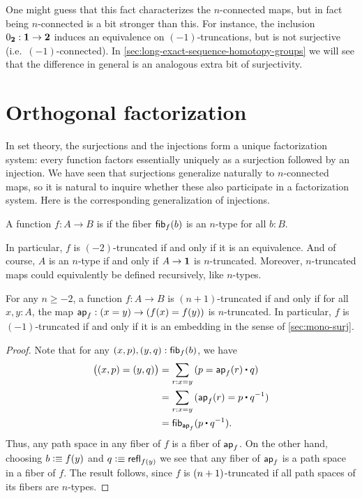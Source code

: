 One might guess that this fact characterizes the $n$-connected maps, but in fact being $n$-connected is a bit stronger than this.
For instance, the inclusion ${0_{\mathbf{2}}}:\mathbf{1} \to\mathbf{2}$ induces an equivalence on $(-1)$-truncations, but is not surjective (i.e.\ $(-1)$-connected).
In \cref{sec:long-exact-sequence-homotopy-groups} we will see that the difference in general is an analogous extra bit of surjectivity.


\section{Orthogonal factorization}
\label{sec:image-factorization}

%
%
In set theory, the surjections and the injections form a unique factorization system: every function factors essentially uniquely as a surjection followed by an injection.
We have seen that surjections generalize naturally to $n$-connected maps, so it is natural to inquire whether these also participate in a factorization system.
Here is the corresponding generalization of injections.

\begin{defn}
  A function $f:A\to B$ is 
if the fiber ${\mathsf{fib}}_{f}(b)$ is an $n$-type for all $b:B$.
\end{defn}

In particular, $f$ is $(-2)$-truncated if and only if it is an equivalence.
And of course, $A$ is an $n$-type if and only if $A\to\mathbf{1}$ is $n$-truncated.
Moreover, $n$-truncated maps could equivalently be defined recursively, like $n$-types.

\begin{lem}\label{thm:modal-mono}
  For any $n\ge -2$, a function $f:A\to B$ is $(n+1)$-truncated if and only if for all $x,y:A$, the map $\mathsf{ap}_{f}:(x=y) \to (f(x)=f(y))$ is $n$-truncated.
  In particular, $f$ is $(-1)$-truncated if and only if it is an embedding in the sense of \cref{sec:mono-surj}.
\end{lem}
\begin{proof}
  Note that for any $(x,p),(y,q):{\mathsf{fib}}_{f}(b)$, we have
  \begin{align*}
    \big((x,p) = (y,q)\big)
    &= \sm{r:x=y} (p = \apfunc f(r)\ct q)\\
    &= \sm{r:x=y} (\apfunc f (r) = p\ct \opp q)\\
    &= \hfib{\apfunc{f}}{p\ct \opp q}.
  \end{align*}
  Thus, any path space in any fiber of $f$ is a fiber of $\mathsf{ap}_{f}$.
  On the other hand, choosing $b\vcentcolon\equiv f(y)$ and $q\vcentcolon\equiv \mathsf{refl}_{f(y)}$ we see that any fiber of $\mathsf{ap}_{f}$ is a path space in a fiber of $f$.
  The result follows, since $f$ is $(n+1)$-truncated if all path spaces of its fibers are $n$-types.
\end{proof}

